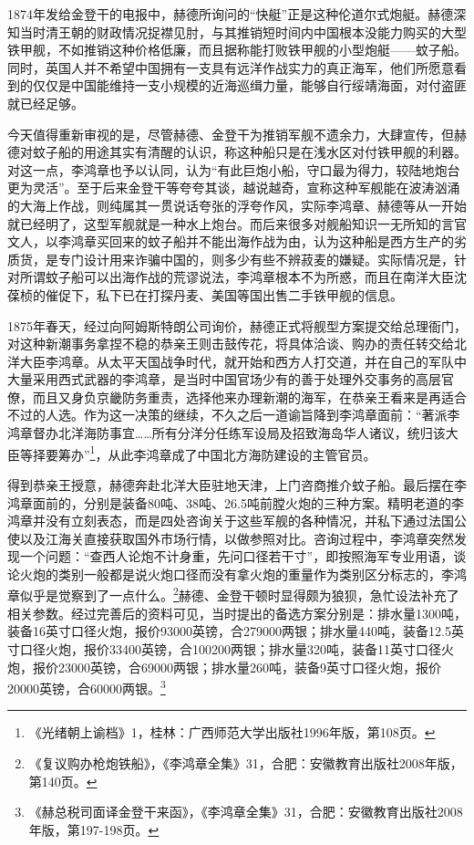 \documentclass[12pt,UTF8]{ctexbook}
\begin{document}
1874年发给金登干的电报中，赫德所询问的“快艇”正是这种伦道尔式炮艇。赫德深知当时清王朝的财政情况捉襟见肘，与其推销短时间内中国根本没能力购买的大型铁甲舰，不如推销这种价格低廉，而且据称能打败铁甲舰的小型炮艇——蚊子船。同时，英国人并不希望中国拥有一支具有远洋作战实力的真正海军，他们所愿意看到的仅仅是中国能维持一支小规模的近海巡缉力量，能够自行绥靖海面，对付盗匪就已经足够。

今天值得重新审视的是，尽管赫德、金登干为推销军舰不遗余力，大肆宣传，但赫德对蚊子船的用途其实有清醒的认识，称这种船只是在浅水区对付铁甲舰的利器。对这一点，李鸿章也予以认同，认为“有此巨炮小船，守口最为得力，较陆地炮台更为灵活”。至于后来金登干等夸夸其谈，越说越奇，宣称这种军舰能在波涛汹涌的大海上作战，则纯属其一贯说话夸张的浮夸作风，实际李鸿章、赫德等从一开始就已经明了，这型军舰就是一种水上炮台。而后来很多对舰船知识一无所知的言官文人，以李鸿章买回来的蚊子船并不能出海作战为由，认为这种船是西方生产的劣质货，是专门设计用来诈骗中国的，则多少有些不辨菽麦的嫌疑。实际情况是，针对所谓蚊子船可以出海作战的荒谬说法，李鸿章根本不为所惑，而且在南洋大臣沈葆桢的催促下，私下已在打探丹麦、美国等国出售二手铁甲舰的信息。

1875年春天，经过向阿姆斯特朗公司询价，赫德正式将舰型方案提交给总理衙门，对这种新潮事务拿捏不稳的恭亲王则击鼓传花，将具体洽谈、购办的责任转交给北洋大臣李鸿章。从太平天国战争时代，就开始和西方人打交道，并在自己的军队中大量采用西式武器的李鸿章，是当时中国官场少有的善于处理外交事务的高层官僚，而且又身负京畿防务重责，选择他来办理新潮的海军，在恭亲王看来是再适合不过的人选。作为这一决策的继续，不久之后一道谕旨降到李鸿章面前：“著派李鸿章督办北洋海防事宜……所有分洋分任练军设局及招致海岛华人诸议，统归该大臣等择要筹办”\footnote{《光绪朝上谕档》1，桂林：广西师范大学出版社1996年版，第108页。}，从此李鸿章成了中国北方海防建设的主管官员。

得到恭亲王授意，赫德奔赴北洋大臣驻地天津，上门咨商推介蚊子船。最后摆在李鸿章面前的，分别是装备80吨、38吨、26.5吨前膛火炮的三种方案。精明老道的李鸿章并没有立刻表态，而是四处咨询关于这些军舰的各种情况，并私下通过法国公使以及江海关直接获取国外市场行情，以做参照对比。咨询过程中，李鸿章突然发现一个问题：“查西人论炮不计身重，先问口径若干寸”，即按照海军专业用语，谈论火炮的类别一般都是说火炮口径而没有拿火炮的重量作为类别区分标志的，李鸿章似乎是觉察到了一点什么。\footnote{《复议购办枪炮铁船》，《李鸿章全集》31，合肥：安徽教育出版社2008年版，第140页。}赫德、金登干顿时显得颇为狼狈，急忙设法补充了相关参数。经过完善后的资料可见，当时提出的备选方案分别是：排水量1300吨，装备16英寸口径火炮，报价93000英镑，合279000两银；排水量440吨，装备12.5英寸口径火炮，报价33400英镑，合100200两银；排水量320吨，装备11英寸口径火炮，报价23000英镑，合69000两银；排水量260吨，装备9英寸口径火炮，报价20000英镑，合60000两银。\footnote{《赫总税司面译金登干来函》，《李鸿章全集》31，合肥：安徽教育出版社2008年版，第197-198页。}
\end{document}
